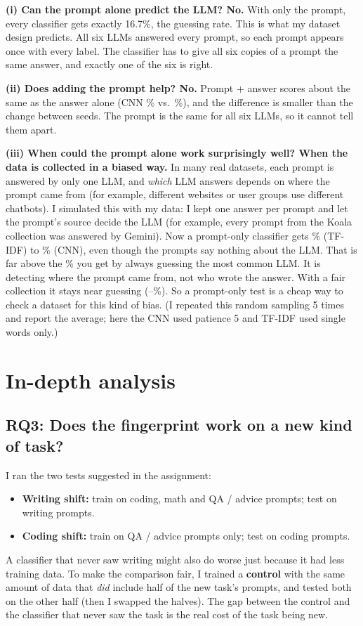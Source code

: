 \documentclass[11pt,letterpaper]{article}
\begin{document}
\textbf{(i) Can the prompt alone predict the LLM? No.} With only the prompt, every classifier gets exactly 16.7\%,
the guessing rate. This is what my dataset design predicts. All six LLMs answered every prompt, so each prompt
appears once with every label. The classifier has to give all six copies of a prompt the same answer, and exactly
one of the six is right.

\textbf{(ii) Does adding the prompt help? No.} Prompt + answer scores about the same as the answer alone (CNN
\RqTwoInOutCnn\% vs.\ \RqTwoOutCnn\%), and the difference is smaller than the change between seeds. The prompt is
the same for all six LLMs, so it cannot tell them apart.

\textbf{(iii) When could the prompt alone work surprisingly well? When the data is collected in a biased way.} In
many real datasets, each prompt is answered by only one LLM, and \emph{which} LLM answers depends on where the
prompt came from (for example, different websites or user groups use different chatbots). I simulated this with my
data: I kept one answer per prompt and let the prompt's source decide the LLM (for example, every prompt from the
Koala collection was answered by Gemini). Now a prompt-only classifier gets \BiasOneLr\% (TF-IDF) to
\BiasOneCnn\% (CNN), even though the prompts say nothing about the LLM. That is far above the \BiasOneMaj\% you
get by always guessing the most common LLM. It is detecting where the prompt came
from, not who wrote the answer. With a fair collection it stays near guessing (\BiasZeroCnn--\BiasZeroLr\%). So a
prompt-only test is a cheap way to check a dataset for this kind of bias. (I repeated this random sampling 5 times and
report the average; here the CNN used patience 5 and TF-IDF used single words only.)

\section{In-depth analysis}

\subsection{RQ3: Does the fingerprint work on a new kind of task?}

I ran the two tests suggested in the assignment:
\begin{itemize}
  \item \textbf{Writing shift:} train on coding, math and QA / advice prompts; test on writing prompts.
  \item \textbf{Coding shift:} train on QA / advice prompts only; test on coding prompts.
\end{itemize}
A classifier that never saw writing might also do worse just because it had less training data. To make the
comparison fair, I trained a \textbf{control} with the same amount of data that \emph{did} include half of the
new task's prompts, and tested both on the other half (then I swapped the halves). The gap between the control and
the classifier that never saw the task is the real cost of the task being new.
\end{document}

